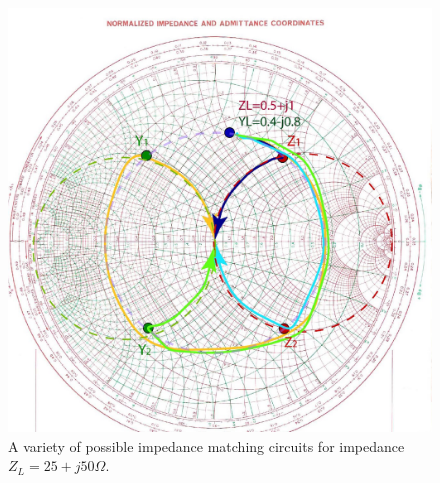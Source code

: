 \documentclass{ximera}
\begin{document}
\begin{figure}[htbp]
\begin{center}
\includegraphics[scale=1]{../jpg/MixedVariety-01-01.jpg}
\end{center}
\caption{A variety of possible impedance matching circuits for impedance $Z_L=25+j50 \Omega$.}
\label{fig:MixedVariety}
\end{figure}
\end{document}
